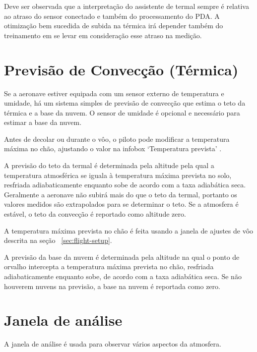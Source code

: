 Deve ser observada que a interpretação do assistente de termal sempre é relativa ao atraso do sensor conectado e também do processamento do PDA.  A otimização bem sucedida de subida na térmica irá depender também do treinamento em se levar em consideração esse atraso na medição.


\section{Previsão de Convecção (Térmica)}\label{sec:convection-forecast}

Se a aeronave estiver equipada com um sensor externo de temperatura e umidade, há um sistema simples de previsão de convecção que estima o teto da térmica e a base da nuvem.  O sensor de umidade é opcional e necessário para estimar a base da nuvem.

Antes de decolar ou durante o vôo, o piloto pode modificar a temperatura máxima no chão, ajustando o valor na infobox ‘Temperatura prevista’  {\InfoBox}.

A previsão do teto da termal é determinada pela altitude pela qual a temperatura atmosférica se iguala à temperatura máxima prevista no solo, resfriada adiabaticamente enquanto sobe de acordo com a taxa adiabática seca.  Geralmente a aeronave não subirá mais do que o teto da termal, portanto os valores medidos são extrapolados para se determinar o teto.  Se a atmosfera é estável, o teto da convecção é reportado como altitude zero.

A temperatura máxima prevista no chão é feita usando a janela de ajustes de vôo descrita na seção 
~\ref{sec:flight-setup}.


%

A previsão da base da nuvem é determinada pela altitude na qual o ponto de orvalho intercepta a temperatura máxima prevista no chão, resfriada adiabaticamente enquanto sobe, de acordo com a taxa adiabática seca.  Se não houverem nuvens na previsão, a base na nuvem é reportada como zero.


\section{Janela de análise}

A janela de análise é usada para observar vários aspectos da atmosfera.


